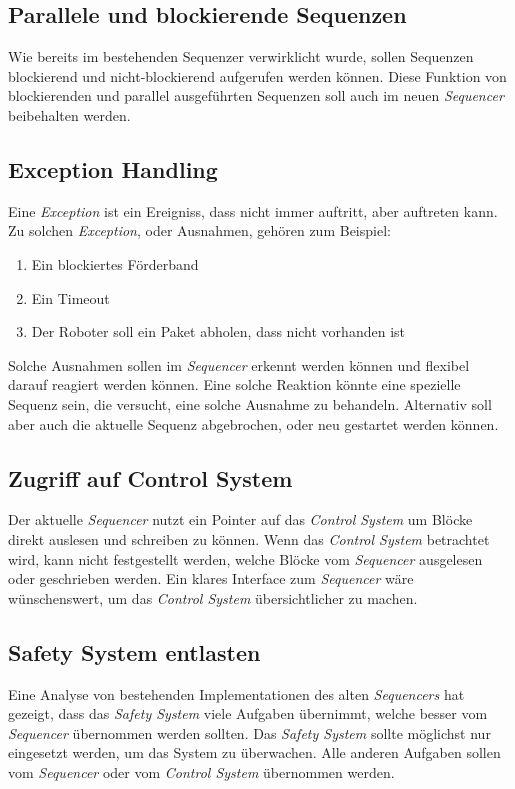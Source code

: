 \subsection{Parallele und blockierende Sequenzen}
Wie bereits im bestehenden Sequenzer verwirklicht wurde, sollen Sequenzen blockierend und nicht-blockierend aufgerufen werden können.
Diese Funktion von blockierenden und parallel ausgeführten Sequenzen soll auch im neuen \textit{Sequencer} beibehalten werden.
 

\subsection{Exception Handling}
Eine \textit{Exception} ist ein Ereigniss, dass nicht immer auftritt, aber auftreten kann.
Zu solchen \textit{Exception}, oder Ausnahmen, gehören zum Beispiel:
\begin{enumerate}
\item Ein blockiertes Förderband
\item Ein Timeout
\item Der Roboter soll ein Paket abholen, dass nicht vorhanden ist
\end{enumerate}
Solche Ausnahmen sollen im \textit{Sequencer} erkennt werden können und flexibel darauf reagiert werden können.
Eine solche Reaktion könnte eine spezielle Sequenz sein, die versucht, eine solche Ausnahme zu behandeln.
Alternativ soll aber auch die aktuelle Sequenz abgebrochen, oder neu gestartet werden können.


\subsection{Zugriff auf Control System}
Der aktuelle \textit{Sequencer} nutzt ein Pointer auf das \textit{Control System} um Blöcke direkt auslesen und schreiben zu können.
Wenn das \textit{Control System} betrachtet wird, kann nicht festgestellt werden, welche Blöcke vom \textit{Sequencer} ausgelesen oder geschrieben werden.
Ein klares Interface zum \textit{Sequencer} wäre wünschenswert, um das \textit{Control System} übersichtlicher zu machen.


\subsection{Safety System entlasten}
Eine Analyse von bestehenden Implementationen des alten \textit{Sequencers} hat gezeigt, dass das \textit{Safety System} viele Aufgaben übernimmt, welche besser vom \textit{Sequencer} übernommen werden sollten.
Das \textit{Safety System} sollte möglichst nur eingesetzt werden, um das System zu überwachen.
Alle anderen Aufgaben sollen vom \textit{Sequencer} oder vom \textit{Control System} übernommen werden.



